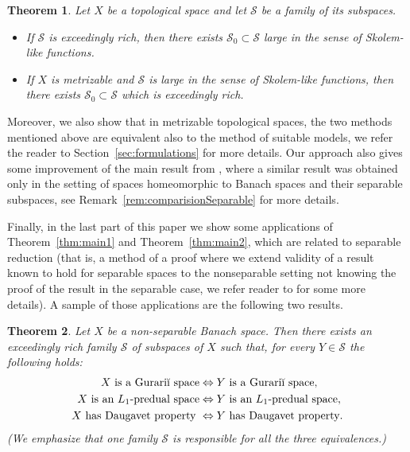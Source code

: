 \documentclass[11pt]{amsart}
\newtheorem{thmx}{Theorem}
\theoremstyle{definition}
\theoremstyle{remark}
\newcommand{\SSS}{\mathcal S}
\begin{document}
\begin{thmx}\label{thm:main3}
Let $X$ be a topological space and let $\SSS$ be a family of its subspaces.
\begin{itemize}
    \item If $\SSS$ is exceedingly rich, then there exists $\SSS_0\subset \SSS$ large in the sense of Skolem-like functions.
    \item If $X$ is metrizable and $\SSS$ is large in the sense of Skolem-like functions, then there exists $\SSS_0\subset \SSS$ which is exceedingly rich.
\end{itemize}
\end{thmx}

\noindent Moreover, we also show that in metrizable topological spaces, the two methods mentioned above are equivalent also to the method of suitable models, we refer the reader to Section~\ref{sec:formulations} for more details. Our approach also gives some improvement of the main result from \cite{C18}, where a similar result was obtained only in the setting of spaces homeomorphic to Banach spaces and their separable subspaces, see Remark~\ref{rem:comparisionSeparable} for more details.

Finally, in the last part of this paper we show some applications of Theorem~\ref{thm:main1} and Theorem~\ref{thm:main2}, which are related to separable reduction (that is, a method of a proof where we extend validity of a result known to hold for separable spaces to the nonseparable setting not knowing the proof of the result in the separable case, we refer reader to \cite{C18} for some more details). A sample of those applications are the following two results.

\begin{thmx}\label{thm:main4}Let $X$ be a non-separable Banach space. Then there exists an exceedingly rich family $\SSS$ of subspaces of $X$ such that, for every $Y\in \SSS$ the following holds:
\[\begin{split}
X \text{ is a Gurari\u{\i} space}  & \Leftrightarrow Y \text{ is a Gurari\u{\i} space},\\
X \text{ is an }L_1\text{-predual space}  & \Leftrightarrow Y \text{ is an } L_1\text{-predual space},\\
X \text{ has Daugavet property }  & \Leftrightarrow Y \text{ has Daugavet property}.
\end{split}\]
(We emphasize that one family $\SSS$ is responsible for all the three equivalences.)
\end{thmx}
\end{document}
